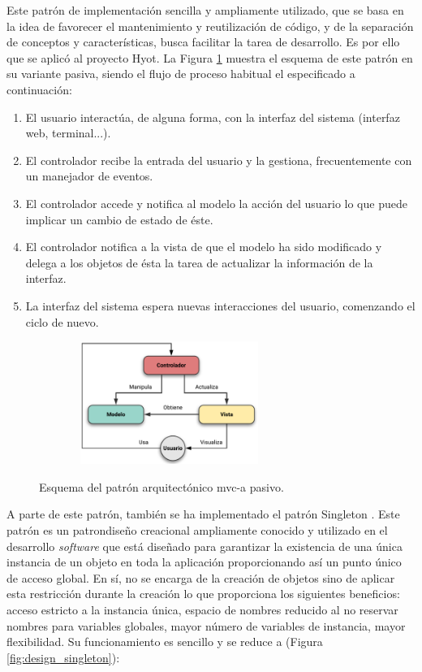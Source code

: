 \documentclass[12pt,a4paper, twoside]{report}
\begin{document}
	 Este patrón de implementación sencilla y ampliamente utilizado, que se basa en la idea de favorecer el mantenimiento y reutilización de código, y de la separación de conceptos y características, busca facilitar la tarea de desarrollo. Es por ello que se aplicó al proyecto Hyot. La Figura \ref{fig:design_mvc} muestra el esquema de este patrón en su variante pasiva, siendo el flujo de proceso habitual el especificado a continuación:
	
	\begin{enumerate}
		\item El usuario interactúa, de alguna forma, con la interfaz del sistema (interfaz web, terminal...).
		\item El controlador recibe la entrada del usuario y la gestiona, frecuentemente con un manejador de eventos.
		\item El controlador accede y notifica al modelo la acción del usuario lo que puede implicar un cambio de estado de éste.
		\item El controlador notifica a la vista de que el modelo ha sido modificado y delega a los objetos de ésta la tarea de actualizar la información de la interfaz.
		\item La interfaz del sistema espera nuevas interacciones del usuario, comenzando el ciclo de nuevo. 
	\end{enumerate}
	
	\begin{figure}[!ht]   
		\caption{Esquema del patrón arquitectónico \gls{mvc-a} pasivo.} 
		\begin{center} 
			\includegraphics[width=8.5cm,height=4cm]{Images/design/mvc.png} \\
			\label{fig:design_mvc} 
		\end{center}  
	\end{figure}
	
	A parte de este patrón, también se ha implementado el patrón Singleton \cite{gof95}. Este patrón es un \gls{patrondiseño} creacional ampliamente conocido y utilizado en el desarrollo \textit{software} que está diseñado para garantizar la existencia de una única instancia de un objeto en toda la aplicación proporcionando así un punto único de acceso global. En sí, no se encarga de la creación de objetos sino de aplicar esta restricción durante la creación lo que proporciona los siguientes beneficios: acceso estricto a la instancia única, espacio de nombres reducido al no reservar nombres para variables globales, mayor número de variables de instancia, mayor flexibilidad. Su funcionamiento es sencillo y se reduce a (Figura \ref{fig:design_singleton}):
	
\end{document}
